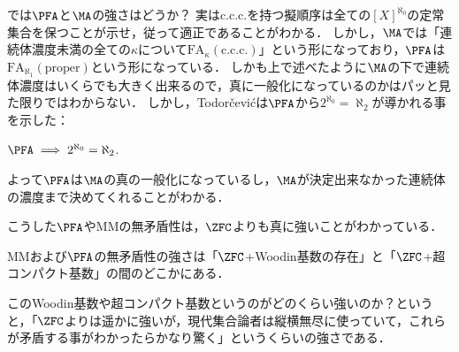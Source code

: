 \documentclass[a4j,leqno]{ltjsarticle}
\newcommand{\FA}{\mathrm{FA}}
\newcommand{\MM}{\mathrm{MM}}
\begin{document}
では$\PFA$と$\MA$の強さはどうか？
実はc.c.c.を持つ擬順序は全ての$[X]^{\aleph_0}$の定常集合を保つことが示せ，従って適正であることがわかる．
しかし，$\MA$では「連続体濃度未満の全ての$\kappa$について$\FA_\kappa(\text{c.c.c.})$」という形になっており，$\PFA$は$\FA_{\aleph_1}(\text{proper})$という形になっている．
しかも上で述べたように$\MA$の下で連続体濃度はいくらでも大きく出来るので，真に一般化になっているのかはパッと見た限りではわからない．
しかし，Todor\v{c}evi\'{c}は$\PFA$から$2^{\aleph_0} = \aleph_2$が導かれる事を示した：
\begin{theorem}[Todorcevic]
 $\PFA \implies 2^{\aleph_0} = \aleph_2$.
\end{theorem}
よって$\PFA$は$\MA$の真の一般化になっているし，$\MA$が決定出来なかった連続体の濃度まで決めてくれることがわかる．

こうした$\PFA$や$\MM$の無矛盾性は，$\ZFC$よりも真に強いことがわかっている．
\begin{theorem}
 $\MM$および$\PFA$の無矛盾性の強さは「$\ZFC$+Woodin基数の存在」と「$\ZFC$+超コンパクト基数」の間のどこかにある．
\end{theorem}
このWoodin基数や超コンパクト基数というのがどのくらい強いのか？というと，「$\ZFC$よりは遥かに強いが，現代集合論者は縦横無尽に使っていて，これらが矛盾する事がわかったらかなり驚く」というくらいの強さである．
\end{document}
